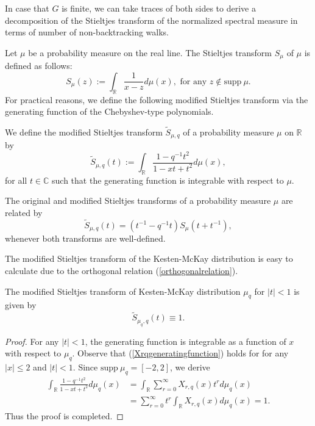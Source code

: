 \documentclass{article}
\begin{document}
In case that $G$ is finite, we can take traces of both sides to derive a decomposition of the Stieltjes transform of the normalized spectral measure in terms of number of non-backtracking walks.

Let $\mu$ be a probability measure on the real line. The Stieltjes transform $S_{\mu}$ of $\mu$ is defined as follows: 
\begin{equation*}
    S_{\mu}(z):=\int_{\mathbb{R}}\frac{1}{x-z}d\mu(x),\,\,\text{for any}\,\,z\notin\mathrm{supp}\ \mu.
\end{equation*}
For practical reasons, we define the following modified Stieltjes transform via the generating function of the Chebyshev-type polynomials.

\begin{definition}
    We define the modified Stieltjes transform $\widetilde{S}_{\mu,q}$ of a probability measure $\mu$ on $\mathbb{R}$ by
\begin{equation*}
    \widetilde{S}_{\mu,q}(t):=\int_{\mathbb{R}}\frac{1-q^{-1}t^2}{1-xt+t^2}d\mu(x),
\end{equation*}
for all $t\in \mathbb{C}$ such that the generating function is integrable with respect to $\mu$.
\end{definition}
\begin{remark}\label{rmk:modifiedStieltjes}
    The original and modified Stieltjes transforms of a probability measure $\mu$ are related by 
    \begin{equation*}
        \widetilde{S}_{\mu,q}(t)=(t^{-1}-q^{-1}t)S_{\mu}(t+t^{-1}),
    \end{equation*}
    whenever both transforms are well-defined.
\end{remark}

The modified Stieltjes transform of the Kesten-McKay distribution is easy to calculate due to the orthogonal relation (\ref{orthogonalrelation}).

\begin{proposition}\label{prop:modifiedStieltjes}
The modified Stieltjes transform of Kesten-McKay distribution $\mu_q$ for $|t|<1$ is given by
    \begin{equation*}
    \widetilde{S}_{\mu_q,q}(t)\equiv1.
\end{equation*}
\end{proposition}
\begin{proof}
For any $|t|< 1$, the generating function is integrable as a function of $x$ with respect to $\mu_q$. Observe that  (\ref{Xrqgeneratingfunction}) holds for for any $|x|\leq 2$ and $|t|< 1$. Since $\mathrm{supp}\ \mu_q=[-2,2]$, we derive
\begin{equation*}
\begin{aligned}
    \int_{\mathbb{R}}\frac{1-q^{-1}t^2}{1-xt+t^2}d\mu_q(x)&=\int_{\mathbb{R}}\sum_{r=0}^{\infty}X_{r,q}(x)t^{r}d\mu_q(x)\\
    &=\sum_{r=0}^{\infty}t^{r}\int_{\mathbb{R}}X_{r,q}(x)d\mu_q(x)=1.
\end{aligned}
\end{equation*}
Thus the proof is completed.
\end{proof}
\end{document}
